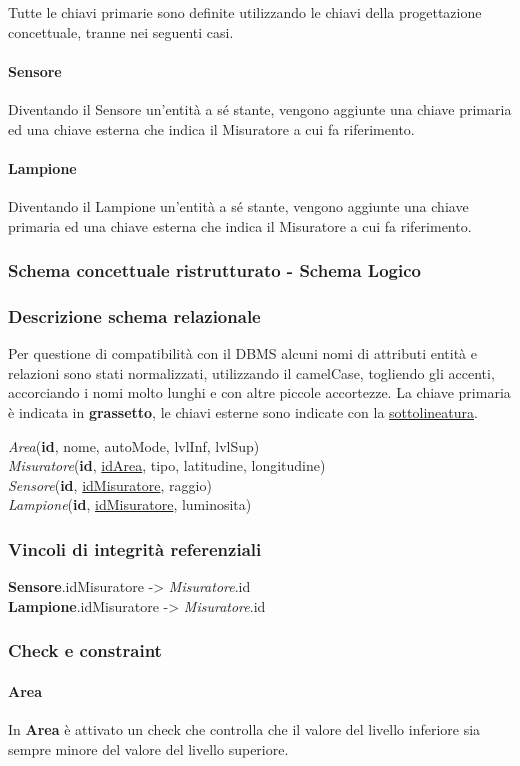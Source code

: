 Tutte le chiavi primarie sono definite utilizzando le chiavi della progettazione concettuale, tranne nei seguenti casi.

\paragraph{Sensore} Diventando il Sensore un'entità a sé stante, vengono aggiunte una chiave primaria ed una chiave esterna che indica il Misuratore a cui fa riferimento.

\paragraph{Lampione} Diventando il Lampione un'entità a sé stante, vengono aggiunte una chiave primaria ed una chiave esterna che indica il Misuratore a cui fa riferimento.

\subsubsection{Schema concettuale ristrutturato - Schema Logico}

\subsubsection{Descrizione schema relazionale}

Per questione di compatibilità con il DBMS alcuni nomi di attributi entità e relazioni sono stati normalizzati, utilizzando il camelCase, togliendo gli accenti, accorciando i nomi molto lunghi e con altre piccole accortezze.
La chiave primaria è indicata in \textbf{grassetto}, le chiavi esterne sono indicate con la \underline{sottolineatura}.

\textit{Area}(\textbf{id}, nome, autoMode, lvlInf, lvlSup) \\
\textit{Misuratore}(\textbf{id}, \underline{idArea}, tipo, latitudine, longitudine) \\
\textit{Sensore}(\textbf{id}, \underline{idMisuratore}, raggio) \\
\textit{Lampione}(\textbf{id}, \underline{idMisuratore}, luminosita)

\subsubsection{Vincoli di integrità referenziali}

\textbf{Sensore}.idMisuratore -> \textit{Misuratore}.id \\
\textbf{Lampione}.idMisuratore -> \textit{Misuratore}.id

\subsubsection{Check e constraint}

\paragraph{Area} In \textbf{Area} è attivato un check che controlla che il valore del livello inferiore sia sempre minore del valore del livello superiore.